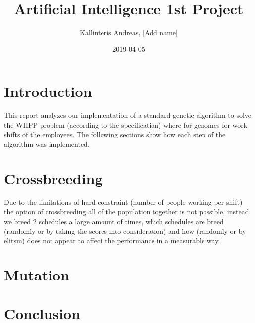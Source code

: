 \documentclass{article}
\title{Artificial Intelligence 1st Project}
\date{2019-04-05}
\author{Kallinteris Andreas, [Add name]}
\begin{document}
\maketitle
\section*{Introduction}
This report analyzes our implementation of a standard genetic algorithm to solve the WHPP problem (according to the specification) where for genomes for work shifts of the employees.
The following sections show how each step of the algorithm was implemented.
\section*{Crossbreeding}
Due to the limitations of hard constraint (number of people working per shift) the option of crossbreeding all of the population together is not possible,
instead we breed 2 schedules a large amount of times,
which schedules are breed (randomly or by taking the scores into consideration) and how (randomly or by elitsm) does not appear to affect the performance in a measurable way.
\section*{Mutation}
\section*{Conclusion}
\end{document}
